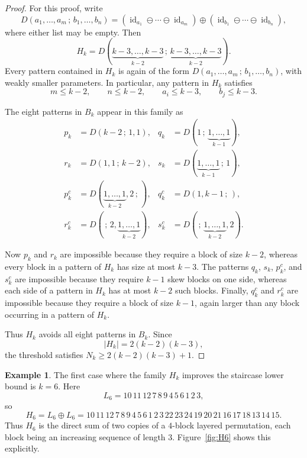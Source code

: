 \documentclass[11pt]{amsart}
\newcommand{\id}{\operatorname{id}}
\theoremstyle{plain}
\theoremstyle{definition}
\newtheorem{example}[theorem]{Example}
\theoremstyle{remark}
\begin{document}
\begin{proof}
  For this proof, write
  \[
    D(a_1,\dots,a_m\,;\,b_1,\dots,b_n)
    =(\id_{a_1}\ominus\cdots\ominus\id_{a_m})\oplus(\id_{b_1}\ominus\cdots\ominus\id_{b_n}),
  \]
  where either list may be empty.  Then
  \[
    H_k=D(\underbrace{k-3,\dots,k-3}_{k-2}\,;\,\underbrace{k-3,\dots,k-3}_{k-2}).
  \]
  Every pattern contained in $H_k$ is again of the form $D(a_1,\dots,a_m\,;\,b_1,\dots,b_n)$, with
  weakly smaller parameters.  In particular, any pattern in $H_k$ satisfies
  \[
    m\leq k-2,\qquad n\leq k-2,\qquad a_i\leq k-3,\qquad b_j\leq k-3.
  \]

  The eight patterns in $B_k$ appear in this family as
  \begin{align*}
    p_k   & = D(k-2\,;\,1,1),                         &
    q_k   & = D(1\,;\,\underbrace{1,\dots,1}_{k-1}),    \\
    r_k   & = D(1,1\,;\,k-2),                         &
    s_k   & = D(\underbrace{1,\dots,1}_{k-1}\,;\,1),    \\
    p_k^c & = D(\underbrace{1,\dots,1}_{k-2},2\,;\,), &
    q_k^c & = D(1,k-1\,;\,),                            \\
    r_k^c & = D(\,;\,2,\underbrace{1,\dots,1}_{k-2}), &
    s_k^c & = D(\,;\,\underbrace{1,\dots,1}_{k-2},2).
  \end{align*}

  Now $p_k$ and $r_k$ are impossible because they require a block of size $k-2$, whereas every block
  in a pattern of $H_k$ has size at most $k-3$.  The patterns $q_k$, $s_k$, $p_k^c$, and $s_k^c$
  are impossible because they require $k-1$ skew blocks on one side, whereas each side of a pattern
  in $H_k$ has at most $k-2$ such blocks.  Finally, $q_k^c$ and $r_k^c$ are impossible because they
  require a block of size $k-1$, again larger than any block occurring in a pattern of $H_k$.

  Thus $H_k$ avoids all eight patterns in $B_k$.  Since
  \[
    |H_k|=2(k-2)(k-3),
  \]
  the threshold satisfies $N_k \geq 2(k-2)(k-3)+1$.
\end{proof}

\begin{example}\label{ex:H6}
  The first case where the family $H_k$ improves the staircase lower bound is $k=6$.  Here
  \[
    L_6=10\,11\,12\,7\,8\,9\,4\,5\,6\,1\,2\,3,
  \]
  so
  \[
    H_6=L_6\oplus L_6
    =10\,11\,12\,7\,8\,9\,4\,5\,6\,1\,2\,3\,22\,23\,24\,19\,20\,21\,16\,17\,18\,13\,14\,15.
  \]
  Thus $H_6$ is the direct sum of two copies of a $4$-block layered permutation, each block being an
  increasing sequence of length $3$.  Figure~\ref{fig:H6} shows this explicitly.
\end{example}
\end{document}
